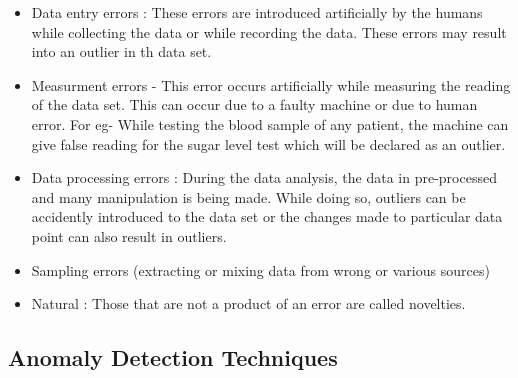\begin{itemize}
	\item Data entry errors : These errors are introduced artificially by the humans while
	collecting the data or while recording the data. These errors may result into an
	outlier in th data set.
	
	
	\item Measurment errors - This error occurs artificially while measuring the reading of
	the data set. This can occur due to a faulty machine or due to human error. For eg- While testing the blood sample of any patient, the machine can give false
	reading for the sugar level test which will be declared as an outlier.
	
	\item Data processing errors : During the data analysis, the data in pre-processed
	and many manipulation is being made. While doing so, outliers can be accidently
	introduced to the data set or the changes made to particular data point can also
	result in outliers.
	\item Sampling errors (extracting or mixing data from wrong or various sources)
	
	\item Natural :  Those that are not a product of an error are called novelties.
	
\end{itemize} 



\subsection{Anomaly Detection Techniques} 

